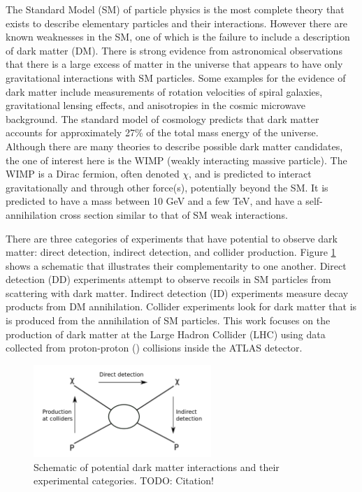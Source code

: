 \label{chapter:introduction}

The Standard Model (SM) of particle physics is the most complete theory that exists to describe elementary particles and their interactions. However there are known weaknesses in the SM, one of which is the failure to include a description of dark matter (DM). There is strong evidence from astronomical observations that there is a large excess of matter in the universe that appears to have only gravitational interactions with SM particles. Some examples for the evidence of dark matter include measurements of rotation velocities of spiral galaxies, gravitational lensing effects, and anisotropies in the cosmic microwave background. The standard model of cosmology predicts that dark matter accounts for approximately 27\% of the total mass energy of the universe. Although there are many theories to describe possible dark matter candidates, the one of interest here is the WIMP (weakly interacting massive particle). The WIMP is a Dirac fermion, often denoted $\chi$, and is predicted to interact gravitationally and through other force(s), potentially beyond the SM. It is predicted to have a mass between 10 GeV and a few TeV, and have a self-annihilation cross section similar to that of SM weak interactions.

There are three categories of experiments that have potential to observe dark matter: direct detection, indirect detection, and collider production. Figure \ref{fig:detection} shows a schematic that illustrates their complementarity to one another. Direct detection (DD) experiments attempt to observe recoils in SM particles from scattering with dark matter. Indirect detection (ID) experiments measure decay products from DM annihilation. Collider experiments look for dark matter that is is produced from the annihilation of SM particles. This work focuses on the production of dark matter at the Large Hadron Collider (LHC) using data collected from proton-proton (\pp) collisions inside the ATLAS detector.

\begin{figure}[htb]
\centering
\includegraphics[width=0.6\textwidth]{Figures/detection.png}
\caption{Schematic of potential dark matter interactions and their experimental categories. {\color{red}TODO: Citation!}}
\label{fig:detection}
\end{figure}

